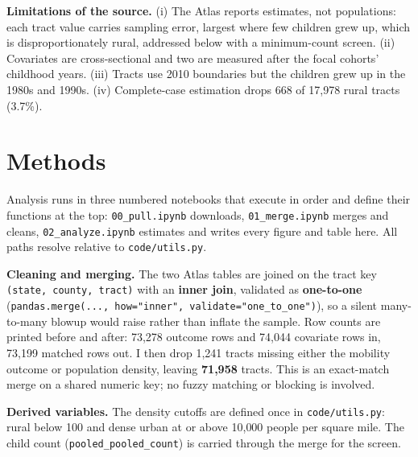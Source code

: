 \documentclass[9pt,twoside]{pnas-new}
\begin{document}
\noindent\textbf{Limitations of the source.} (i) The Atlas reports estimates, not
populations: each tract value carries sampling error, largest where few
children grew up, which is disproportionately rural, addressed below with a
minimum-count screen. (ii) Covariates are cross-sectional and two are measured
after the focal cohorts' childhood years. (iii) Tracts use 2010 boundaries but
the children grew up in the 1980s and 1990s. (iv) Complete-case estimation
drops 668 of 17{,}978 rural tracts (3.7\%).

\section{Methods}
\label{sec:methods}

Analysis runs in three numbered notebooks that execute in order and define
their functions at the top: \texttt{00\_pull.ipynb} downloads,
\texttt{01\_merge.ipynb} merges and cleans, \texttt{02\_analyze.ipynb}
estimates and writes every figure and table here. All paths resolve relative to
\texttt{code/utils.py}.

\noindent\textbf{Cleaning and merging.} The two Atlas tables are joined on the tract
key \texttt{(state, county, tract)} with an \textbf{inner join}, validated as
\textbf{one-to-one} (\texttt{pandas.merge(..., how="inner",
validate="one\_to\_one")}), so a silent many-to-many blowup would raise rather than inflate the sample. Row counts are printed
before and after: 73{,}278 outcome rows and 74{,}044 covariate rows in,
73{,}199 matched rows out. I then drop 1{,}241 tracts missing either the
mobility outcome or population density, leaving \textbf{71{,}958} tracts. This
is an exact-match merge on a shared numeric key; no fuzzy matching or blocking
is involved.

\noindent\textbf{Derived variables.} The density cutoffs are defined once in
\texttt{code/utils.py}: rural below 100 and dense urban at or above 10{,}000
people per square mile. The child count (\texttt{pooled\_pooled\_count}) is
carried through the merge for the screen.
\end{document}
